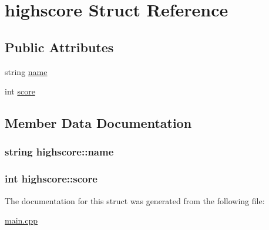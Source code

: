\hypertarget{structhighscore}{\section{highscore Struct Reference}
\label{structhighscore}
}
\subsection*{Public Attributes}
\begin{DoxyCompactItemize}
\item 
string \hyperlink{structhighscore_a457d3d144e3fd13d9d2d52a8d34b6d71}{name}
\item 
int \hyperlink{structhighscore_a51e3313d14eb74e063e67f349da7b37b}{score}
\end{DoxyCompactItemize}


\subsection{Member Data Documentation}
\hypertarget{structhighscore_a457d3d144e3fd13d9d2d52a8d34b6d71}{
\subsubsection[{name}]{\setlength{\rightskip}{0pt plus 5cm}string highscore\+::name}}\label{structhighscore_a457d3d144e3fd13d9d2d52a8d34b6d71}
\hypertarget{structhighscore_a51e3313d14eb74e063e67f349da7b37b}{
\subsubsection[{score}]{\setlength{\rightskip}{0pt plus 5cm}int highscore\+::score}}\label{structhighscore_a51e3313d14eb74e063e67f349da7b37b}


The documentation for this struct was generated from the following file\+:\begin{DoxyCompactItemize}
\item 
\hyperlink{main_8cpp}{main.\+cpp}\end{DoxyCompactItemize}
